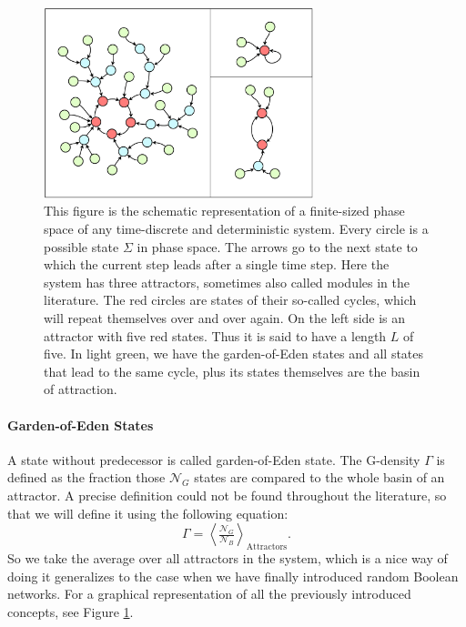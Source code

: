 \begin{figure}[t]
	\centering
	\includegraphics[width=0.7\textwidth]{Plots/phase_space}
	\par
	\vspace{0.3cm}
	\caption{This figure is the schematic representation of a finite-sized phase space of any time-discrete and deterministic system. Every circle is a possible state $ \Sigma $ in phase space. The arrows go to the next state to which the current step leads after a single time step. Here the system has three attractors, sometimes also called modules in the literature. The red circles are states of their so-called cycles, which will repeat themselves over and over again. On the left side is an attractor with five red states. Thus it is said to have a length $ L $ of five. In light green, we have the garden-of-Eden states and all states that lead to the same cycle, plus its states themselves are the basin of attraction.}
	\label{fig:phase_space}
\end{figure}

\paragraph*{Garden-of-Eden States}\label{sec:garden-of-Eden}
A state without predecessor is called garden-of-Eden state. The G-density $\Gamma$ is defined as the fraction those $\mathcal{N}_G$ states are compared to the whole basin of an attractor. A precise definition could not be found throughout the literature, so that we will define it using the following equation:
\begin{equation}\label{eq:g-density}
\Gamma = \left\langle\tfrac{\mathcal{N}_{G}}{\mathcal{N}_{B}}\right\rangle_{\text{Attractors}}.
\end{equation}
So we take the average over all attractors in the system, which is a nice way of doing it generalizes to the case when we have finally introduced random Boolean networks. For a graphical representation of all the previously introduced concepts, see Figure \ref{fig:phase_space}.

